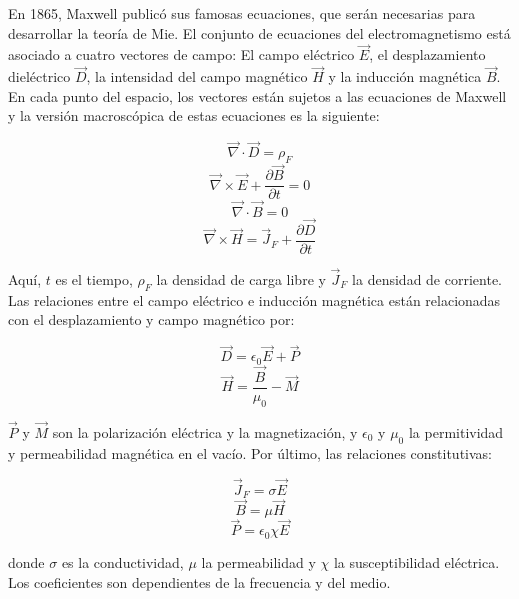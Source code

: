 \documentclass{article}
\begin{document}
En 1865, Maxwell publicó sus famosas ecuaciones, que serán 
necesarias para desarrollar la teoría de Mie. El conjunto 
de ecuaciones del electromagnetismo está asociado a cuatro 
vectores de campo: El campo eléctrico $\vec E$, el 
desplazamiento dieléctrico $\vec D$, la intensidad del 
campo magnético $\vec H$ y la inducción magnética $\vec B$. 
En cada punto del espacio, los vectores están sujetos a 
las ecuaciones de Maxwell y la versión macroscópica de 
estas ecuaciones es la siguiente:

\begin{equation}
    \vec{\nabla} \cdot \vec{D} = \rho_F
\end{equation}
\begin{equation}
    \vec{\nabla} \times \vec{E} + \frac{\partial \vec{B}}{\partial t} = 0
\end{equation}
\begin{equation}
    \vec{\nabla} \cdot \vec B = 0
\end{equation}
\begin{equation}
    \vec \nabla \times \vec H = \vec J_F + \frac{\partial\vec D}{\partial t}
\end{equation}

Aquí, $t$ es el tiempo, $\rho_F$ la densidad de carga libre y $\vec J_F$ la densidad de corriente. Las relaciones entre el campo eléctrico e inducción magnética están relacionadas con el desplazamiento y campo magnético por:

\begin{equation}
    \vec D = \epsilon_0 \vec E + \vec P
\end{equation}
\begin{equation}
    \vec H = \frac{\vec B}{\mu_0} - \vec M
\end{equation}

$\vec P$ y $\vec M$ son la polarización eléctrica y la magnetización, y $\epsilon_0$ y $\mu_0$ la permitividad y permeabilidad magnética en el vacío. Por último, las relaciones constitutivas:

\begin{equation}
    \vec J_F = \sigma \vec E
\end{equation}
\begin{equation}
    \vec B = \mu \vec H
\end{equation}
\begin{equation}
    \vec P = \epsilon_0\chi \vec E
\end{equation}

donde $\sigma$ es la conductividad, $\mu$ la permeabilidad y $\chi$ la susceptibilidad eléctrica. Los coeficientes son dependientes de la frecuencia y del medio. %
\end{document}
